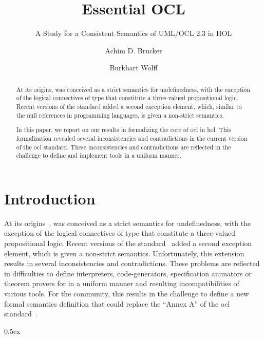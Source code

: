 \documentclass[11pt,a4paper]{scrartcl}
\begin{document}
\title{Essential OCL}
\subtitle{A Study for a Consistent Semantics of UML/OCL 2.3 in HOL}
\subject{Extended Version}
\author{Achim D. Brucker \and Burkhart Wolff}
\begin{abstract}
  At its origins, \OCL was conceived as a strict semantics for
  undefinedness, with the exception of the logical connectives of type
   that constitute a three-valued propositional
  logic.  Recent versions of the \OCL standard added a second
  exception element, which, similar to the null references in
  programming languages, is given a non-strict semantics.

  In this paper, we report on our results in formalizing the core of
  \acs{ocl} in \acf{hol}. This formalization revealed several
  inconsistencies and contradictions in the current version of the
  \acs{ocl} standard.  These inconsistencies and contradictions are
  reflected in the challenge to define and implement \OCL tools in a
  uniform manner.
\end{abstract}


\maketitle

\tableofcontents


\section{Introduction}
At its origins~\cite{richters:precise:2002,omg:ocl:1997}, \OCL was
conceived as a strict semantics for undefinedness, with the exception
of the logical connectives of type  that constitute
a three-valued propositional logic.  Recent versions of the \OCL
standard~\cite{omg:ocl:2006,omg:ocl:2012} added a second exception
element, which is given a non-strict semantics.  Unfortunately, this
extension results in several inconsistencies and contradictions. These
problems are reflected in difficulties to define interpreters,
code-generators, specification animators or theorem provers for \OCL
in a uniform manner and resulting incompatibilities of various
tools. For the \OCL community, this results in the challenge to define
a new formal semantics definition \OCL that could replace the ``Annex
A'' of the \acs{ocl} standard~\cite{omg:ocl:2012}.


\parindent 0pt\parskip 0.5ex





\end{document}
